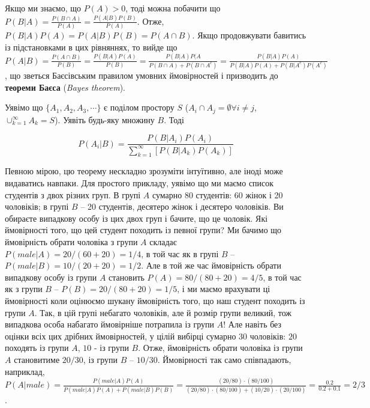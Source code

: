 \documentclass[
  11pt,
]{book}
\begin{document}
Якщо ми знаємо, що \(P(A)>0\), тоді можна побачити що \(P(B|A) = \frac{P(B \cap A)}{P(A)} = \frac{P(A | B)P(B)}{P(A)}\). Отже, \(P(B|A)P(A)=P(A|B)P(B)=P(A \cap B)\). Якщо продовжувати бавитись із підстановками в цих рівняннях, то вийде що \(P(A|B) = \frac{P(A \cap B)}{P(B)} = \frac{P(B|A) P(A)}{P(B)} = \frac{P(B|A)P(A}{P(B \cap A) + P(B \cap A^c)} = \frac{P(B|A)P(A)}{P(B|A) P(A) + P(B|A^c)P(A^c)}\), що зветься Баєсівським правилом умовних ймовірностей і призводить до \textbf{теореми Баєса} (\emph{Bayes theorem}).

Уявімо що \(\{A_1, A_2, A_3, \cdots\}\) є поділом простору \(S\) (\(A_i \cap A_j = \emptyset \forall i \neq j\), \(\cup_{k=1}^{\infty} A_k = S\)). Уявіть будь-яку множину \(B\). Тоді

\[P(A_i|B) = \frac{P(B|A_i)P(A_i)}{\sum_{k=1}^{\infty}[P(B|A_k)P(A_k)]}\]

Певною мірою, цю теорему нескладно зрозуміти інтуїтивно, але іноді може видаватись навпаки. Для простого прикладу, уявімо що ми маємо список студентів з двох різних груп. В групі \(A\) сумарно 80 студентів: 60 жінок і 20 чоловіків; в групі \(B\) -- 20 студентів, десятеро жінок і десятеро чоловіків. Ви обираєте випадкову особу із цих двох груп і бачите, що це чоловік. Які ймовірності того, що цей студент походить із певної групи? Ми бачимо що ймовірність обрати чоловіка з групи \(A\) складає \(P(male|A) =  20/(60+20) = 1/4\), в той час як в групі \(B\) -- \(P(male|B) = 10/(20+20) = 1/2\). Але в той же час ймовірність обрати випадкову особу із групи \(A\) становить \(P(A) = 80/(80+20) = 4/5\), в той час як з групи \(B\) -- \(P(B) = 20/(80+20) = 1/5\), і ми маємо врахувати ці ймовірності коли оцінюємо шукану ймовірність того, що наш студент походить із групи \(A\). Так, в цій групі небагато чоловіків, але й розмір групи великий, тож випадкова особа набагато ймовірніше потрапила із групи \(A\)! Але навіть без оцінки всіх цих дрібних ймовірностей, у цілій вибірці сумарно \(30\) чоловіків: \(20\) походять із групи \(A\), \(10\) - із групи \(B\). Отже, ймовірність обрати чоловіка із групи \(A\) становитиме \(20/30\), із групи \(B\) -- \(10/30\). Ймовірності так само співпадають, наприклад, \(P(A|male) = \frac{P(male|A)P(A)}{P(male|A)P(A) + P(male|B)P(B)} = \frac{(20/80) \cdot (80/100)}{(20/80) \cdot (80/100) + (10/20) \cdot (20/100)} = \frac{0.2}{0.2+0.1}=2/3\).
\end{document}
